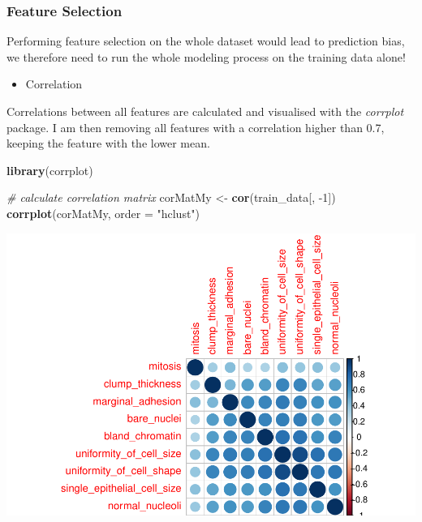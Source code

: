 \documentclass[]{article}
\newenvironment{Shaded}{\begin{snugshade}}{\end{snugshade}}
\newcommand{\KeywordTok}[1]{\textcolor[rgb]{0.13,0.29,0.53}{\textbf{{#1}}}}
\newcommand{\DataTypeTok}[1]{\textcolor[rgb]{0.13,0.29,0.53}{{#1}}}
\newcommand{\DecValTok}[1]{\textcolor[rgb]{0.00,0.00,0.81}{{#1}}}
\newcommand{\StringTok}[1]{\textcolor[rgb]{0.31,0.60,0.02}{{#1}}}
\newcommand{\CommentTok}[1]{\textcolor[rgb]{0.56,0.35,0.01}{\textit{{#1}}}}
\newcommand{\NormalTok}[1]{{#1}}
\providecommand{\tightlist}{%
  \setlength{\itemsep}{0pt}\setlength{\parskip}{0pt}}
\begin{document}
\subsubsection{Feature Selection}\label{feature-selection}

Performing feature selection on the whole dataset would lead to
prediction bias, we therefore need to run the whole modeling process on
the training data alone!

\begin{itemize}
\tightlist
\item
  Correlation
\end{itemize}

Correlations between all features are calculated and visualised with the
\emph{corrplot} package. I am then removing all features with a
correlation higher than 0.7, keeping the feature with the lower mean.

\begin{Shaded}
\begin{Highlighting}[]
\KeywordTok{library}\NormalTok{(corrplot)}

\CommentTok{# calculate correlation matrix}
\NormalTok{corMatMy <-}\StringTok{ }\KeywordTok{cor}\NormalTok{(train_data[, -}\DecValTok{1}\NormalTok{])}
\KeywordTok{corrplot}\NormalTok{(corMatMy, }\DataTypeTok{order =} \StringTok{"hclust"}\NormalTok{)}
\end{Highlighting}
\end{Shaded}

\begin{center}\includegraphics{webinar_code_files/figure-latex/unnamed-chunk-25-1} \end{center}
\end{document}
